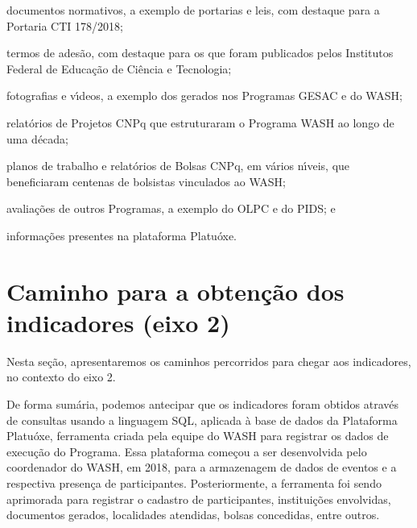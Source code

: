 \documentclass[
12pt,		%
openright,	%
twoside,  %
a4paper,			%
chapter=TITLE,		%
english,			%
french,				%
spanish,			%
brazil				%
]{USPSC-classe/USPSC}
\begin{document}
\begin{alineas}
\item documentos normativos, a exemplo de portarias e leis, com destaque para a Portaria CTI 178/2018;
\item termos de ades\~ao, com destaque para os que foram publicados pelos  Institutos Federal de Educa\c{c}\~ao de Ci\^encia e Tecnologia;
\item fotografias e v\'{\i}deos, a exemplo dos gerados nos Programas GESAC e do WASH;
\item relat\'orios de Projetos CNPq que estruturaram o Programa WASH ao longo de uma d\'ecada;
\item planos de trabalho e relat\'orios de Bolsas CNPq, em v\'arios n\'{\i}veis, que beneficiaram centenas de bolsistas vinculados ao WASH;
\item avalia\c{c}\~oes de outros Programas, a exemplo do OLPC e do PIDS; e
\item informa\c{c}\~oes presentes na plataforma Platu\'oxe.
\end{alineas}

\section[Caminho para a obten\c{c}\~ao dos indicadores (eixo 2)]{Caminho para a obten\c{c}\~ao dos indicadores (eixo 2)}\label{Caminho para a obten\c{c}\~ao dos indicadores (eixo 2)}
Nesta se\c{c}\~ao, apresentaremos os caminhos percorridos para chegar aos indicadores, no contexto do eixo 2.

















De forma sum\'aria, podemos antecipar que os indicadores foram obtidos atrav\'es de consultas usando a linguagem SQL, aplicada \`a base de dados da Plataforma Platu\'oxe, ferramenta criada pela equipe do WASH para registrar os dados de execu\c{c}\~ao do Programa. Essa plataforma come\c{c}ou a ser desenvolvida pelo coordenador do WASH, em 2018, para a armazenagem de dados de eventos e a respectiva presen\c{c}a de participantes. Posteriormente, a ferramenta foi sendo aprimorada para registrar o cadastro de participantes, institui\c{c}\~oes envolvidas, documentos gerados, localidades atendidas, bolsas concedidas, entre outros.
\end{document}
